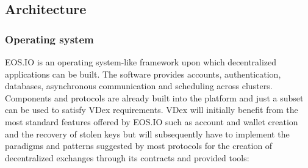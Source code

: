 \documentclass[]{article}
\begin{document}
									
\subsection{Architecture}
	
	\subsubsection{Operating system}
	EOS.IO is an operating system-like framework upon which decentralized applications can be built. The software provides accounts, authentication, databases, asynchronous communication and scheduling across clusters. Components and protocols are already built into the platform and just a subset can be used to satisfy VDex requirements. VDex will initially benefit from the most standard features offered by EOS.IO such as account and wallet creation and the recovery of stolen keys but will subsequently have to implement the paradigms and patterns suggested by most protocols for the creation of decentralized exchanges through its contracts and provided tools:	\cite{3}\\
  
\end{document}
